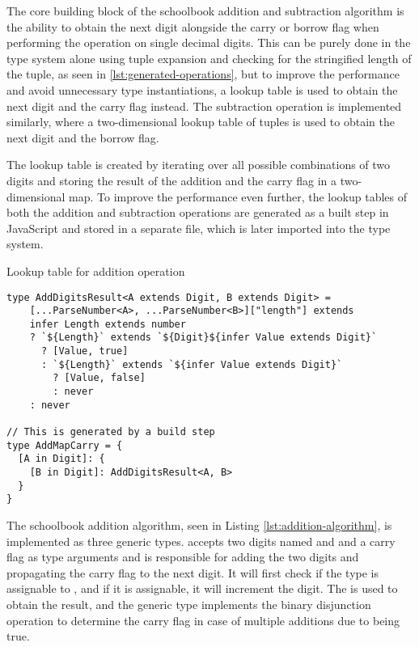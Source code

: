 The core building block of the schoolbook addition and subtraction algorithm is the ability to obtain the next digit alongside the carry or borrow flag when performing the operation on single decimal digits. This can be purely done in the type system alone using tuple expansion and checking for the stringified length of the tuple, as seen in \ref{lst:generated-operations}, but to improve the performance and avoid unnecessary type instantiations, a lookup table is used to obtain the next digit and the carry flag instead. The subtraction operation is implemented similarly, where a two-dimensional lookup table of tuples is used to obtain the next digit and the borrow flag.

The lookup table is created by iterating over all possible combinations of two digits and storing the result of the addition and the carry flag in a two-dimensional map. To improve the performance even further, the lookup tables of both the addition and subtraction operations are generated as a built step in JavaScript and stored in a separate file, which is later imported into the type system.

\begin{listing}[ht]
  \caption{Lookup table for addition operation}\label{lst:generated-operations}
  \begin{verbatim}
type AddDigitsResult<A extends Digit, B extends Digit> =
    [...ParseNumber<A>, ...ParseNumber<B>]["length"] extends 
    infer Length extends number
    ? `${Length}` extends `${Digit}${infer Value extends Digit}`
      ? [Value, true]
      : `${Length}` extends `${infer Value extends Digit}`
        ? [Value, false]
        : never
    : never

// This is generated by a build step
type AddMapCarry = {
  [A in Digit]: {
    [B in Digit]: AddDigitsResult<A, B>
  }
}
\end{verbatim}
\end{listing}

The schoolbook addition algorithm, seen in Listing \ref{lst:addition-algorithm}, is implemented as three generic types.  accepts two digits named  and  and a carry flag as type arguments and is responsible for adding the two digits and propagating the carry flag to the next digit. It will first check if the  type is assignable to , and if it is assignable, it will increment the  digit. The  is used to obtain the result, and the  generic type implements the binary disjunction operation to determine the carry flag in case of multiple additions due to  being true.

